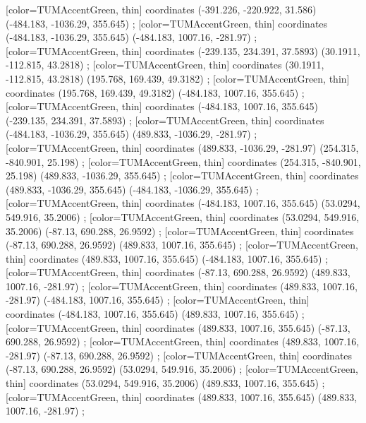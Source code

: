         [color=TUMAccentGreen, thin] coordinates { (-391.226, -220.922, 31.586) (-484.183, -1036.29, 355.645) };
        [color=TUMAccentGreen, thin] coordinates { (-484.183, -1036.29, 355.645) (-484.183, 1007.16, -281.97) };
        [color=TUMAccentGreen, thin] coordinates { (-239.135, 234.391, 37.5893) (30.1911, -112.815, 43.2818) };
        [color=TUMAccentGreen, thin] coordinates { (30.1911, -112.815, 43.2818) (195.768, 169.439, 49.3182) };
        [color=TUMAccentGreen, thin] coordinates { (195.768, 169.439, 49.3182) (-484.183, 1007.16, 355.645) };
        [color=TUMAccentGreen, thin] coordinates { (-484.183, 1007.16, 355.645) (-239.135, 234.391, 37.5893) };
        [color=TUMAccentGreen, thin] coordinates { (-484.183, -1036.29, 355.645) (489.833, -1036.29, -281.97) };
        [color=TUMAccentGreen, thin] coordinates { (489.833, -1036.29, -281.97) (254.315, -840.901, 25.198) };
        [color=TUMAccentGreen, thin] coordinates { (254.315, -840.901, 25.198) (489.833, -1036.29, 355.645) };
        [color=TUMAccentGreen, thin] coordinates { (489.833, -1036.29, 355.645) (-484.183, -1036.29, 355.645) };
        [color=TUMAccentGreen, thin] coordinates { (-484.183, 1007.16, 355.645) (53.0294, 549.916, 35.2006) };
        [color=TUMAccentGreen, thin] coordinates { (53.0294, 549.916, 35.2006) (-87.13, 690.288, 26.9592) };
        [color=TUMAccentGreen, thin] coordinates { (-87.13, 690.288, 26.9592) (489.833, 1007.16, 355.645) };
        [color=TUMAccentGreen, thin] coordinates { (489.833, 1007.16, 355.645) (-484.183, 1007.16, 355.645) };
        [color=TUMAccentGreen, thin] coordinates { (-87.13, 690.288, 26.9592) (489.833, 1007.16, -281.97) };
        [color=TUMAccentGreen, thin] coordinates { (489.833, 1007.16, -281.97) (-484.183, 1007.16, 355.645) };
        [color=TUMAccentGreen, thin] coordinates { (-484.183, 1007.16, 355.645) (489.833, 1007.16, 355.645) };
        [color=TUMAccentGreen, thin] coordinates { (489.833, 1007.16, 355.645) (-87.13, 690.288, 26.9592) };
        [color=TUMAccentGreen, thin] coordinates { (489.833, 1007.16, -281.97) (-87.13, 690.288, 26.9592) };
        [color=TUMAccentGreen, thin] coordinates { (-87.13, 690.288, 26.9592) (53.0294, 549.916, 35.2006) };
        [color=TUMAccentGreen, thin] coordinates { (53.0294, 549.916, 35.2006) (489.833, 1007.16, 355.645) };
        [color=TUMAccentGreen, thin] coordinates { (489.833, 1007.16, 355.645) (489.833, 1007.16, -281.97) };
